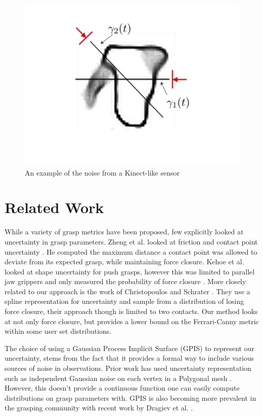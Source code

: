 \documentclass[letterpaper, 10 pt, conference]{ieeeconf}  %
\begin{document}
\begin{figure}[ht!]
\centering
\includegraphics[scale = 0.3]{figures/Slide02.jpg}
\caption{An example of the noise from a Kinect-like sensor}
\vspace*{-10pt}
\label{fig:noisy data}
\end{figure}


\section{Related Work}

While a variety of grasp metrics have been proposed, few explicitly looked at uncertainty in grasp parameters. Zheng et al. looked at friction and contact point uncertainty \cite{zheng2005}. He computed the maximum distance a contact point was allowed to deviate from its expected grasp, while maintaining force closure. Kehoe et al. looked at shape uncertainty for push grasps, however this was limited to parallel jaw grippers and only measured the probability of force closure \cite{kehoe2012toward}. More closely related to our approach is the work of Christopoulos and Schrater \cite{christopoulos2007handling}. They use a spline representation for uncertainty and sample from a distribution of losing force closure, their approach though is limited to two contacts. Our method looks at not only force closure, but provides a lower bound on the Ferrari-Canny metric within some user set distributions.  

The choice of using a Gaussian Process Implicit Surface (GPIS) to represent our uncertainty, stems from the fact that it provides a formal way to include various sources of noise in observations. Prior work has used uncertainty representation such as independent Gaussian noise on each vertex in a Polygonal mesh \cite{kehoe2012toward}. However, this doesn't provide a continuous function one can easily compute distributions on grasp parameters with. GPIS is also becoming more prevalent in the grasping community with recent work by Dragiev et al. \cite{dragiev2011} . 
\end{document}
